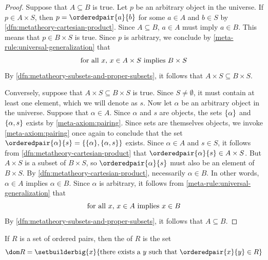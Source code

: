 \begin{proof}
    Suppose that \( A \subseteq B \) is true.
    Let \( p \) be an arbitrary object in the universe.
    If \( p \in A \times S \), then \( p = \orderedpair{a}{b} \) for some \( a \in A \) and \( b \in S \) by \cref{dfn:metatheory-cartesian-product}.
    Since \( A \subseteq B \), \( a \in A \) must imply \( a \in B \).
    This means that \( p \in B \times S \) is true.
    Since \( p \) is arbitrary, we conclude by \cref{meta-rule:universal-generalization} that
    \begin{equation*}
        \text{for all \( x \), \( x \in A \times S \) implies \( B \times S \)}
    \end{equation*}
    By \cref{dfn:metatheory-subsets-and-proper-subsets}, it follows that \( A \times S \subseteq B \times S \).

    \vspace{0.3cm}
    \noindent
    Conversely, suppose that \( A \times S \subseteq B \times S \) is true.
    Since \( S \neq \emptyset \), it must contain at least one element, which we will denote as \( s \).
    Now let \( \alpha \) be an arbitrary object in the universe.
    Suppose that \( \alpha \in A \).
    Since \( \alpha \) and \( s \) are objects, the sets \( \mleft\{ \alpha \mright\} \) and \( \mleft\{ \alpha, s \mright\} \) exists
    by \cref{meta-axiom:pairing}.
    Since sets are themselves objects, we invoke \cref{meta-axiom:pairing} once again to conclude that the set
    \( \orderedpair{\alpha}{s} = \mleft\{ \mleft\{ \alpha \mright\}, \mleft\{ \alpha, s \mright\}  \mright\} \) exists.
    Since \( \alpha \in A \) and \( s \in S \), it follows from \cref{dfn:metatheory-cartesian-product} that
    \( \orderedpair{\alpha}{s} \in A \times S \).
    But \( A \times S \) is a subset of \( B \times S \), so \( \orderedpair{\alpha}{s} \) must also be an element of \( B \times S \).
    By \cref{dfn:metatheory-cartesian-product}, necessarily \( \alpha \in B \).
    In other words, \( \alpha \in A \) implies \( \alpha \in B \).
    Since \( \alpha \) is arbitrary, it follows from \cref{meta-rule:universal-generalization} that
    \begin{equation*}
        \text{for all \( x \), \( x \in A \) implies \( x \in B \)}
    \end{equation*}
    By \cref{dfn:metatheory-subsets-and-proper-subsets}, it follows that \( A \subseteq B \).
\end{proof}

\begin{dfn}[Domain]
     \label{dfn:metatheory-domain-of-a-set-of-ordered-pairs}
    If \( R \) is a set of ordered pairs, then the  of \( R \) is the set
    \begin{equation*}
        \dom R = \setbuilderbig{x}{\text{there exists a \( y \) such that \( \orderedpair{x}{y} \in R \)}}
    \end{equation*}
\end{dfn}

